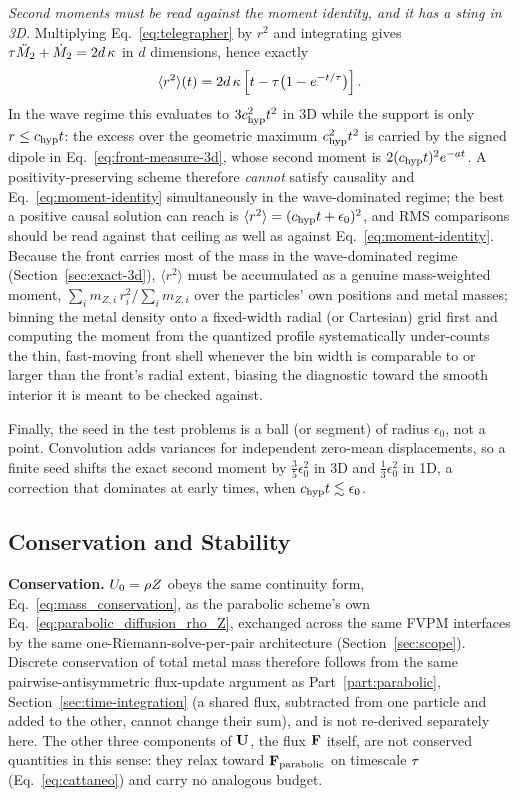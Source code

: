 \emph{Second moments must be read against the moment identity, and it
has a sting in 3D.} Multiplying Eq.~\eqref{eq:telegrapher} by $r^2$ and
integrating gives $\tau\ddot M_2+\dot M_2=2d\,\kappa$ in $d$
dimensions, hence exactly
\begin{equation}
  \label{eq:moment-identity}
  \langle r^2\rangle(t)
  = 2d\,\kappa\left[t-\tau\big(1-e^{-t/\tau}\big)\right] .
\end{equation}
In the wave regime this evaluates to $3c_{\rm hyp}^2t^2$ in 3D while the
support is only $r\le c_{\rm hyp} t$: the excess over the geometric maximum
$c_{\rm hyp}^2t^2$ is carried by the signed dipole in
Eq.~\eqref{eq:front-measure-3d}, whose second moment is
$2(c_{\rm hyp} t)^2e^{-at}$. A positivity-preserving scheme therefore
\emph{cannot} satisfy causality and Eq.~\eqref{eq:moment-identity}
simultaneously in the wave-dominated regime; the best a positive causal
solution can reach is $\langle r^2\rangle=(c_{\rm hyp} t+\epsilon_0)^2$, and
RMS comparisons should be read against that ceiling as well as against
Eq.~\eqref{eq:moment-identity}. Because the front carries most of the mass
in the wave-dominated regime (Section~\ref{sec:exact-3d}), $\langle
r^2\rangle$ must be accumulated as a genuine mass-weighted moment,
$\sum_i m_{Z,i}\,r_i^2/\sum_i m_{Z,i}$ over the particles' own positions
and metal masses; binning the metal density onto a fixed-width radial (or
Cartesian) grid first and computing the moment from the quantized profile
systematically under-counts the thin, fast-moving front shell whenever the
bin width is comparable to or larger than the front's radial extent,
biasing the diagnostic toward the smooth interior it is meant to be
checked against.

Finally, the seed in the test problems is a ball (or segment) of radius
$\epsilon_0$, not a point. Convolution adds variances for independent
zero-mean displacements, so a finite seed shifts the exact second moment
by $\tfrac35\epsilon_0^2$ in 3D and $\tfrac13\epsilon_0^2$ in 1D,
a correction that dominates at early times, when $c_{\rm hyp} t\lesssim\epsilon_0$.

\subsection{Conservation and Stability}
\label{sec:hyperbolic-validation}

\textbf{Conservation.} $U_0=\rho Z$ obeys the same continuity form,
Eq.~\eqref{eq:mass_conservation}, as the parabolic scheme's own
Eq.~\eqref{eq:parabolic_diffusion_rho_Z}, exchanged across the same FVPM
interfaces by the same one-Riemann-solve-per-pair architecture
(Section~\ref{sec:scope}). Discrete conservation of total metal mass
therefore follows from the same pairwise-antisymmetric flux-update
argument as Part~\ref{part:parabolic}, Section~\ref{sec:time-integration}
(a shared flux, subtracted from one particle and added to the other,
cannot change their sum), and is not re-derived separately here. The
other three components of $\mathbf{U}$, the flux $\mathbf{F}$ itself, are not
conserved quantities in this sense: they relax toward
$\mathbf{F}_{\rm parabolic}$ on timescale $\tau$
(Eq.~\eqref{eq:cattaneo}) and carry no analogous budget.

